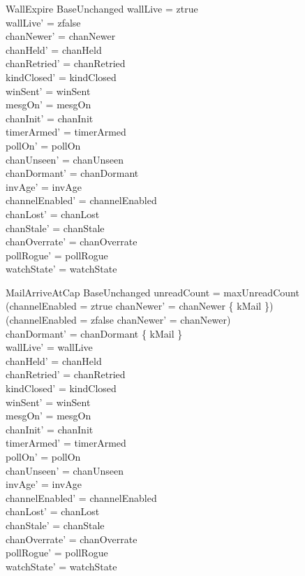 \documentclass[a4paper,10pt,fleqn]{article}
\begin{document}
\begin{schema}{WallExpire}
  BaseUnchanged
  \where
  wallLive = ztrue \\
  wallLive' = zfalse \\
  chanNewer' = chanNewer \\
  chanHeld' = chanHeld \\
  chanRetried' = chanRetried \\
  kindClosed' = kindClosed \\
  winSent' = winSent \\
  mesgOn' = mesgOn \\
  chanInit' = chanInit \\
  timerArmed' = timerArmed \\
  pollOn' = pollOn \\
  chanUnseen' = chanUnseen \\
  chanDormant' = chanDormant \\
  invAge' = invAge \\
  channelEnabled' = channelEnabled \\
  chanLost' = chanLost \\
  chanStale' = chanStale \\
  chanOverrate' = chanOverrate \\
  pollRogue' = pollRogue \\
  watchState' = watchState
\end{schema}

\begin{schema}{MailArriveAtCap}
  BaseUnchanged
  \where
  unreadCount = maxUnreadCount \\
  (channelEnabled = ztrue \implies
  chanNewer' = chanNewer \cup \{ kMail \}) \\
  (channelEnabled = zfalse \implies chanNewer' = chanNewer) \\
  chanDormant' = chanDormant \setminus \{ kMail \} \\
  wallLive' = wallLive \\
  chanHeld' = chanHeld \\
  chanRetried' = chanRetried \\
  kindClosed' = kindClosed \\
  winSent' = winSent \\
  mesgOn' = mesgOn \\
  chanInit' = chanInit \\
  timerArmed' = timerArmed \\
  pollOn' = pollOn \\
  chanUnseen' = chanUnseen \\
  invAge' = invAge \\
  channelEnabled' = channelEnabled \\
  chanLost' = chanLost \\
  chanStale' = chanStale \\
  chanOverrate' = chanOverrate \\
  pollRogue' = pollRogue \\
  watchState' = watchState
\end{schema}
\end{document}
